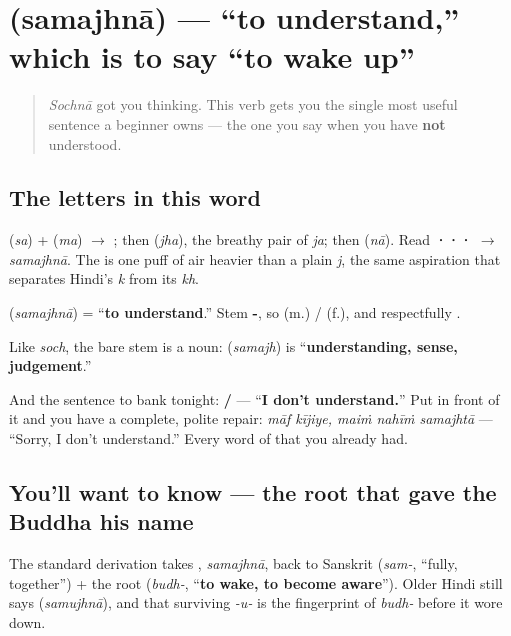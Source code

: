 \section[\texorpdfstring{\hi{समझना} / \hi{समझ} … (samajhnā …)}{समझना / समझ … (samajhnā …)}]{ (samajhnā) — \textquotedblleft{}to understand,\textquotedblright{} which is to say \textquotedblleft{}to wake up\textquotedblright{}}

\label{lesson:HI-C34-samajhna}



\begin{quote}
\emph{Sochnā} got you thinking. This verb gets you the single most useful sentence a beginner owns — the one you say when you have \textbf{not} understood.
\end{quote}

\subsection*{The letters in this word}
\textbf{} (\emph{sa}) + \textbf{} (\emph{ma}) $\to$ \textbf{}; then \textbf{} (\emph{jha}), the breathy pair of \emph{ja}; then \textbf{} (\emph{nā}). Read \textbf{···} $\to$ \emph{samajhnā}. The \textbf{} is one puff of air heavier than a plain \emph{j}, the same aspiration that separates Hindi's \emph{k} from its \emph{kh}.

\begin{cousinweb}
\textbf{} (\emph{samajhnā}) = \textquotedblleft{}\textbf{to understand}.\textquotedblright{} Stem \textbf{-}, so \textbf{  } (m.) / \textbf{  } (f.), and respectfully \textbf{  }.

Like \emph{soch}, the bare stem is a noun: \textbf{} (\emph{samajh}) is \textquotedblleft{}\textbf{understanding, sense, judgement}.\textquotedblright{}

And the sentence to bank tonight: \textbf{   / } — \textquotedblleft{}\textbf{I don't understand.}\textquotedblright{} Put \textbf{ } in front of it and you have a complete, polite repair: \emph{māf kījiye, maiṁ nahīṁ samajhtā} — \textquotedblleft{}Sorry, I don't understand.\textquotedblright{} Every word of that you already had.
\end{cousinweb}

\subsection*{You'll want to know — the root that gave the Buddha his name}
The standard derivation takes \textbf{}, \emph{samajhnā}, back to Sanskrit \textbf{} (\emph{sam-}, \textquotedblleft{}fully, together\textquotedblright{}) + the root \textbf{} (\emph{budh-}, \textquotedblleft{}\textbf{to wake, to become aware}\textquotedblright{}). Older Hindi still says \textbf{} (\emph{samujhnā}), and that surviving \emph{-u-} is the fingerprint of \emph{budh-} before it wore down.

